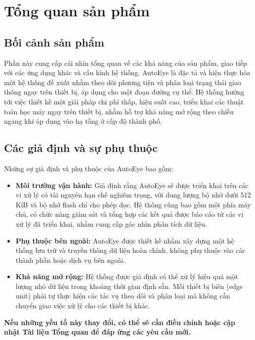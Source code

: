 \section{Tổng quan sản phẩm}
\label{product_overview}
\subsection{Bối cảnh sản phẩm}
\quad Phần này cung cấp cái nhìn tổng quan về các khả năng của sản phẩm, giao tiếp với các ứng dụng khác và cấu hình hệ thống. AutoEye là đặc tả và hiện thực hóa một hệ thống đề xuất nhằm theo dõi phương tiện và phân loại trạng thái giao thông ngay trên thiết bị, áp dụng cho một đoạn đường cụ thể. Hệ thống hướng tới việc thiết kế một giải pháp chi phí thấp, hiệu suất cao, triển khai các thuật toán học máy ngay trên thiết bị, nhằm hỗ trợ khả năng mở rộng theo chiều ngang khi áp dụng vào hạ tầng ở cấp độ thành phố.

\subsection{Các giả định và sự phụ thuộc}
\quad Những sự giả định và phụ thuộc của AutoEye bao gồm:


\begin{itemize}
    \item \textbf{Môi trường vận hành:} Giả định rằng AutoEye sẽ được triển khai trên các vi xử lý có tài nguyên hạn chế nghiêm trọng, với dung lượng bộ nhớ dưới 512 KiB và bộ nhớ flash chỉ cho phép đọc. Hệ thống cũng bao gồm một phía máy chủ, có chức năng giám sát và tổng hợp các kết quả được báo cáo từ các vi xử lý đã triển khai, nhằm cung cấp góc nhìn phân tích dữ liệu.
    
    \item \textbf{Phụ thuộc bên ngoài:} AutoEye được thiết kế nhằm xây dựng một hệ thống lưu trữ và truyền thông dữ liệu hoàn chỉnh, không phụ thuộc vào các thành phần hoặc dịch vụ bên ngoài.
    
    \item \textbf{Khả năng mở rộng:} Hệ thống được giả định có thể xử lý hiệu quả một lượng nhỏ dữ liệu trong khoảng thời gian định sẵn. Mỗi thiết bị biên (edge unit) phải tự thực hiện các tác vụ theo dõi và phân loại mà không cần chuyển giao việc xử lý cho các thiết bị khác.
\end{itemize}

\quad \textbf{Nếu những yếu tố này thay đổi, có thể sẽ cần điều chỉnh hoặc cập nhật Tài liệu Tổng quan để đáp ứng các yêu cầu mới.}

